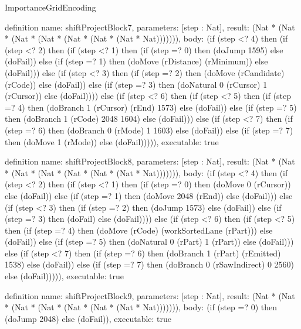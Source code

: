 \begin{lexlean}{ImportanceGridEncoding}
\begin{semanticmodule}
definition{
  name: shiftProjectBlock7,
  parameters: [step : Nat],
  result: (Nat * (Nat * (Nat * (Nat * (Nat * (Nat * (Nat * Nat))))))),
  body: (if (step <? 4) then
      (if (step <? 2) then
      (if (step <? 1) then
      (if (step =? 0) then (doJump 1595) else (doFail)) else
      (if (step =? 1) then (doMove (rDistance) (rMinimum)) else (doFail))) else
      (if (step <? 3) then
      (if (step =? 2) then (doMove (rCandidate) (rCode)) else (doFail)) else
      (if (step =? 3) then (doNatural 0 (rCursor) 1 (rCursor)) else (doFail)))) else
      (if (step <? 6) then
      (if (step <? 5) then
      (if (step =? 4) then (doBranch 1 (rCursor) (rEnd) 1573) else (doFail)) else
      (if (step =? 5) then (doBranch 1 (rCode) 2048 1604) else (doFail))) else
      (if (step <? 7) then
      (if (step =? 6) then (doBranch 0 (rMode) 1 1603) else (doFail)) else
      (if (step =? 7) then (doMove 1 (rMode)) else (doFail))))),
  executable: true
}

definition{
  name: shiftProjectBlock8,
  parameters: [step : Nat],
  result: (Nat * (Nat * (Nat * (Nat * (Nat * (Nat * (Nat * Nat))))))),
  body: (if (step <? 4) then
      (if (step <? 2) then
      (if (step <? 1) then
      (if (step =? 0) then (doMove 0 (rCursor)) else (doFail)) else
      (if (step =? 1) then (doMove 2048 (rEnd)) else (doFail))) else
      (if (step <? 3) then
      (if (step =? 2) then (doJump 1573) else (doFail)) else
      (if (step =? 3) then (doFail) else (doFail)))) else
      (if (step <? 6) then
      (if (step <? 5) then
      (if (step =? 4) then (doMove (rCode) (workSortedLane (rPart))) else (doFail)) else
      (if (step =? 5) then (doNatural 0 (rPart) 1 (rPart)) else (doFail))) else
      (if (step <? 7) then
      (if (step =? 6) then (doBranch 1 (rPart) (rEmitted) 1538) else (doFail)) else
      (if (step =? 7) then (doBranch 0 (rSawIndirect) 0 2560) else (doFail))))),
  executable: true
}

definition{
  name: shiftProjectBlock9,
  parameters: [step : Nat],
  result: (Nat * (Nat * (Nat * (Nat * (Nat * (Nat * (Nat * Nat))))))),
  body: (if (step =? 0) then (doJump 2048) else (doFail)),
  executable: true
}


\end{semanticmodule}
\end{lexlean}
